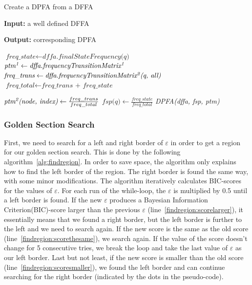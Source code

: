 \documentclass[
a4paper,
12pt
]{scrartcl}
\begin{document}
\begin{algorithm}[H]
\caption{Create a DPFA from a DFFA}\label{alg:normalize}
\begin{algorithmic}[1]
\item \textbf{Input:} a well defined DFFA
\item \textbf{Output:} corresponding DPFA

        \State $\textit{freq\_state} \gets \textit{dffa.finalStateFrequency(q)}$
        \State $\textit{ptm\textsuperscript{1}} \gets \textit{dffa.frequencyTransitionMatrix\textsuperscript{1}}$ \label{normalize:ptm}
         \State $\textit{freq\_trans} \gets \textit{dffa.frequencyTransitionMatrix\textsuperscript{2}(q, all)}$
         \State $\textit{freq\_total} \gets \textit{freq\_trans + freq\_state}$  \label{normalize:sum}

   	 \State $\textit{ptm\textsuperscript{2}(node, index)} \gets \frac{freq\_trans}{freq\_total}$ \label{normalize:divide}
   	  \State $\textit{fsp(q)} \gets \frac{freq\_state}{freq\_total}$
       \EndIf
\EndFor
\State \Return \textit{DPFA(dffa, fsp, ptm)}
\end{algorithmic}
\end{algorithm}

\subsubsection{Golden Section Search}

First, we need to search for a left and right border of $\varepsilon$ in order to get a region for our golden section search. This is done by the following algorithm~\ref{alg:findregion}. In order to save space, the algorithm only explains how to find the left border of the region. The right border is found the same way, with some minor modifications. The algorithm iteratively calculates BIC-scores for the values of $\varepsilon$. For each run of the while-loop, the $\varepsilon$ is multiplied by 0.5 until a left border is found. If the new $\varepsilon$ produces a Bayesian Information Criterion(BIC)-score larger than the previous $\varepsilon$ (line~\ref{findregion:scorelarger}), it essentially means that we found a right border, but the left border is further to the left and we need to search again. If the new score is the same as the old score  (line~\ref{findregion:scorethesame}), we search again. If the value of the score doesn't change for 5 consecutive tries, we break the loop and take the last value of $\varepsilon$ as our left border. Last but not least, if the new score is smaller than the old score (line~\ref{findregion:scoresmaller}), we found the left border and can continue searching for the right border (indicated by the dots in the pseudo-code).
\end{document}
